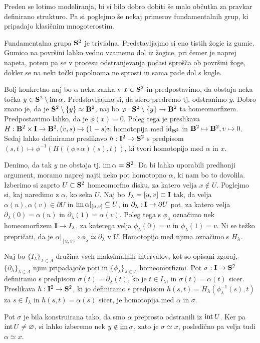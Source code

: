 \documentclass[11pt, a4paper]{article}
\begin{document}
Preden se lotimo modeliranja, bi si bilo dobro dobiti še malo občutka za pravkar definirano strukturo. Pa si poglejmo še nekaj primerov fundamentalnih grup, ki pripadajo klasičnim mnogoterostim.


\begin{zgled}
    Fundamentalna grupa $\S^2$ je trivialna. Predstavljajmo si eno tistih žogic iz gumic. Gumico na površini lahko vedno vzamemo dol iz žogice, pri čemer je naprej napeta, potem pa se v procesu odstranjevanja počasi sprošča ob površini žoge, dokler se na neki točki popolnoma ne sprosti in sama pade dol s kugle.

    Bolj konkretno naj bo $\alpha$ neka zanka v $x \in \S^2$ in predpostavimo, da obstaja neka točka $y \in \S^2 \setminus \im \alpha$. Predstavljajmo si, da sfero predremo tj. odstranimo $y$. Dobro znano je, da je $\S^2 \setminus \{y\} \approx \B^2$, naj bo $\phi : \S^2 \setminus \{y\} \to \B^2$ ta homeomorfizem. Predpostavimo lahko, da je $\phi(x) = 0$. Poleg tega je preslikava $H : \B^2 \times \I \to \B^2, (v, s) \mapsto (1 - s) v$ homotopija med $\id_{\B^2}$ in $\B^2 \mapsto \B^2, v \mapsto 0$. Sedaj lahko definiramo preslikavo $h : \I^2 \to \S^2$ s predpisom $(s, t) \mapsto \phi^{-1}(H((\phi \circ \alpha)(s), t))$, ki tvori homotopijo med $\alpha$ in $x$.

    Denimo, da tak $y$ ne obstaja tj. $\im \alpha = \S^2$. Da bi lahko uporabili predhonji argument, moramo naprej najti neko pot homotopno $\alpha$, ki nam bo to dovolila. Izberimo si zaprto $U \subset \S^2$ homeomorfno disku, za katero velja $x \notin U$. Poglejmo si, kaj naredimo z $\alpha$, ko seka $U$. Naj bo $I_\lambda = [u, v] \subset \I$ tak, da velja $\alpha(u), \alpha(v) \in \partial U$ in $\im \alpha|_{[u, v]} \subseteq U$, in $\partial_\lambda : \I \to \partial U$ pot, za katero velja $\partial_\lambda(0) = \alpha(u)$ in $\partial_\lambda(1) = \alpha(v)$. Poleg tega s $\phi_\lambda$ označimo nek homeomorfizem $\I \to I_\lambda$, za katerega velja $\phi_\lambda(0) = u$ in $\phi_\lambda(1) = v$. Ni se težko prepričati, da je $\alpha|_{[u, v]} \circ \phi_\lambda \simeq \partial_\lambda$ v $U$. Homotopijo med njima označimo s $H_\lambda$.

    Naj bo $\{I_\lambda\}_{\lambda \in \Lambda}$ družina vseh maksimalnih intervalov, kot so opisani zgoraj, $\{\partial_\lambda\}_{\lambda \in \Lambda}$ njim pripadajoče poti in $\{\phi_\lambda\}_{\lambda \in \Lambda}$ homeomorfizmi. Pot $\sigma : \I \to \S^2$ definiramo s predpisom $\sigma(t) = \partial_\lambda(t)$, ko je $t \in I_\lambda$, in $\sigma(t) = \alpha(t)$ sicer. Preslikava $h : \I^2 \to \S^2$, ki jo definiramo s predpisom $h(s, t) = H_\lambda(\phi_\lambda^{-1}(s), t)$ za $s \in I_\lambda$ in $h(s, t) = \alpha(s)$ sicer, je homotopija med $\alpha$ in $\sigma$.

    Pot $\sigma$ je bila konstruirana tako, da smo $\alpha$ preprosto odstranili iz $\interior U$. Ker pa $\interior U \neq \emptyset$, si lahko izberemo nek $y \notin \im\sigma$, zato je $\sigma \simeq x$, posledično pa velja tudi $\alpha \simeq x$.
    \label{fundamentalna-grupa-S2}
\end{zgled}
\end{document}
